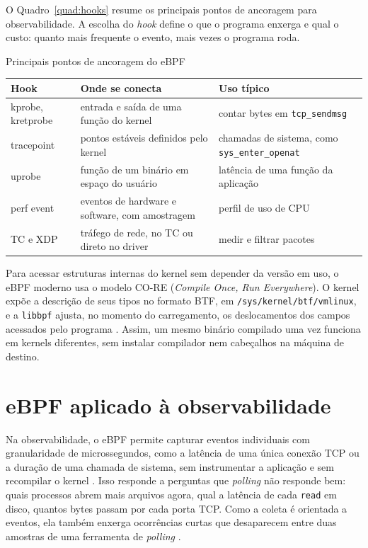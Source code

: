 O Quadro~\ref{quad:hooks} resume os principais pontos de ancoragem para observabilidade. A escolha do \textit{hook} define o que o programa enxerga e qual o custo: quanto mais frequente o evento, mais vezes o programa roda.

\begin{quadro}[htb]
  \caption{Principais pontos de ancoragem do eBPF}
  \label{quad:hooks}
  \small
  \begin{tabular}{@{}P{2.6cm}P{5.4cm}P{6.2cm}@{}}
    \toprule
    \textbf{Hook} & \textbf{Onde se conecta} & \textbf{Uso típico} \\
    \midrule
    kprobe, kretprobe & entrada e saída de uma função do kernel & contar bytes em \texttt{tcp\_sendmsg} \\
    tracepoint & pontos estáveis definidos pelo kernel & chamadas de sistema, como \texttt{sys\_enter\_openat} \\
    uprobe & função de um binário em espaço do usuário & latência de uma função da aplicação \\
    perf event & eventos de hardware e software, com amostragem & perfil de uso de CPU \\
    TC e XDP & tráfego de rede, no TC ou direto no driver & medir e filtrar pacotes \\
    \bottomrule
  \end{tabular}
\end{quadro}

Para acessar estruturas internas do kernel sem depender da versão em uso, o eBPF moderno usa o modelo CO-RE (\textit{Compile Once, Run Everywhere}). O kernel expõe a descrição de seus tipos no formato BTF, em \texttt{/sys/kernel/btf/vmlinux}, e a \texttt{libbpf} ajusta, no momento do carregamento, os deslocamentos dos campos acessados pelo programa \cite{nakryiko2020}. Assim, um mesmo binário compilado uma vez funciona em kernels diferentes, sem instalar compilador nem cabeçalhos na máquina de destino.

\section{eBPF aplicado à observabilidade}

Na observabilidade, o eBPF permite capturar eventos individuais com granularidade de microssegundos, como a latência de uma única conexão TCP ou a duração de uma chamada de sistema, sem instrumentar a aplicação e sem recompilar o kernel \cite{gregg2019}. Isso responde a perguntas que \textit{polling} não responde bem: quais processos abrem mais arquivos agora, qual a latência de cada \texttt{read} em disco, quantos bytes passam por cada porta TCP. Como a coleta é orientada a eventos, ela também enxerga ocorrências curtas que desaparecem entre duas amostras de uma ferramenta de \textit{polling} \cite{research2024}.

